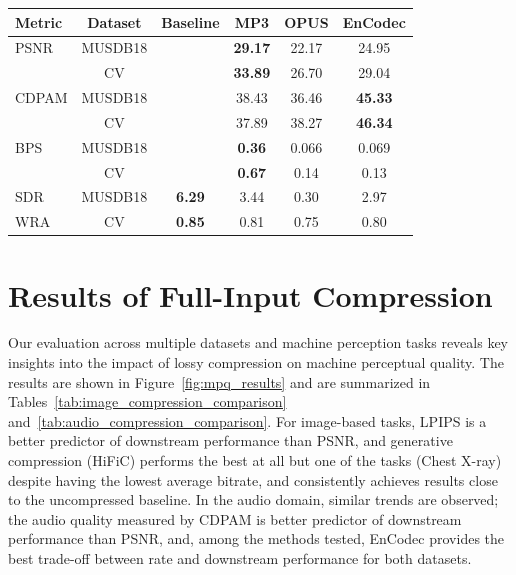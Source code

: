 \documentclass[10pt,twocolumn,letterpaper]{article}
\begin{document}
\begin{table}[!htb]
\begin{subtable}{.4\linewidth}
         \setlength{\tabcolsep}{3pt}
        {\small\begin{tabular}{lccccc}
        \toprule
        Metric & Dataset & Baseline & MP3 & OPUS & EnCodec \\
        \midrule
        PSNR & MUSDB18 &  &\textbf{ 29.17} & 22.17 & 24.95 \\
             & CV &  & \textbf{33.89} & 26.70 & 29.04 \\
        \midrule
        CDPAM & MUSDB18 &  & 38.43 & 36.46 & \textbf{45.33} \\
              & CV &  & 37.89 & 38.27 & \textbf{46.34} \\
        \midrule
        BPS & MUSDB18 &  & \textbf{0.36} & 0.066 & 0.069 \\
            & CV &  & \textbf{0.67} & 0.14 & 0.13 \\
        \midrule
        SDR & MUSDB18 & \textbf{6.29} & 3.44 & 0.30 & 2.97 \\
        \midrule
        WRA & CV & \textbf{0.85} & 0.81 & 0.75 & 0.80 \\
        \bottomrule
        \end{tabular}}
    \end{subtable}%
\end{table}

\section{Results of Full-Input Compression}
\label{sec:full-input-results}
Our evaluation across multiple datasets and machine perception tasks reveals key insights into the impact of lossy compression on machine perceptual quality. The results are shown in Figure~\ref{fig:mpq_results} and are summarized in Tables~\ref{tab:image_compression_comparison} and~\ref{tab:audio_compression_comparison}. For image-based tasks, LPIPS is a better predictor of downstream performance than PSNR, and generative compression (HiFiC) performs the best at all but one of the tasks (Chest X-ray) despite having the lowest average bitrate, and consistently achieves results close to the uncompressed baseline. In the audio domain, similar trends are observed; the audio quality measured by CDPAM is better predictor of downstream performance than PSNR, and, among the methods tested, EnCodec provides the best trade-off between rate and downstream performance for both datasets.
\end{document}
